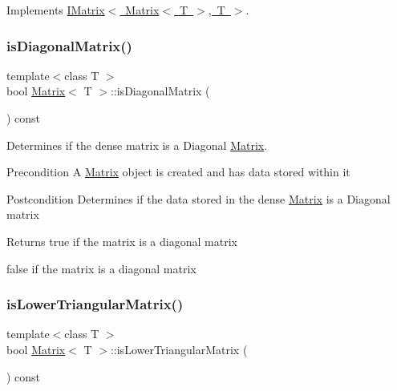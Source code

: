 Implements \mbox{\hyperlink{class_i_matrix_a58632b018f4023768db7963e22f468da}{I\+Matrix$<$ Matrix$<$ T $>$, T $>$}}.

\mbox{\label{class_matrix_a899d992e9151c92ad301afc6699ba9c4}} 
\subsubsection{\texorpdfstring{isDiagonalMatrix()}{isDiagonalMatrix()}}
{\footnotesize\ttfamily template$<$class T $>$ \\
bool \mbox{\hyperlink{class_matrix}{Matrix}}$<$ T $>$\+::is\+Diagonal\+Matrix (\begin{DoxyParamCaption}{ }\end{DoxyParamCaption}) const}



Determines if the dense matrix is a Diagonal \mbox{\hyperlink{class_matrix}{Matrix}}. 

\begin{DoxyPrecond}{Precondition}
A \mbox{\hyperlink{class_matrix}{Matrix}} object is created and has data stored within it 
\end{DoxyPrecond}
\begin{DoxyPostcond}{Postcondition}
Determines if the data stored in the dense \mbox{\hyperlink{class_matrix}{Matrix}} is a Diagonal matrix
\end{DoxyPostcond}
\begin{DoxyReturn}{Returns}
true if the matrix is a diagonal matrix 

false if the matrix is a diagonal matrix 
\end{DoxyReturn}
\mbox{\label{class_matrix_a6e1df160cc8cb63f5b0bb58398b6e7ca}} 
\subsubsection{\texorpdfstring{isLowerTriangularMatrix()}{isLowerTriangularMatrix()}}
{\footnotesize\ttfamily template$<$class T $>$ \\
bool \mbox{\hyperlink{class_matrix}{Matrix}}$<$ T $>$\+::is\+Lower\+Triangular\+Matrix (\begin{DoxyParamCaption}{ }\end{DoxyParamCaption}) const}



